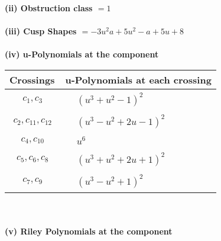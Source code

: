 \documentclass[1p]{elsarticle_modified}
\theoremstyle{definition}
\begin{document}
\flushleft \textbf{(ii) Obstruction class $= 1$}\\~\\
\flushleft \textbf{(iii) Cusp Shapes $= -3 u^2 a+5 u^2- a+5 u+8$}\\~\\
\newpage\renewcommand{\arraystretch}{1}
\flushleft \textbf{(iv) u-Polynomials at the component}\newline \\
\begin{tabular}{m{50pt}|m{274pt}}
Crossings & \hspace{64pt}u-Polynomials at each crossing \\
\hline $$\begin{aligned}c_{1},c_{3}\end{aligned}$$&$\begin{aligned}
&(u^3+u^2-1)^2
\end{aligned}$\\
\hline $$\begin{aligned}c_{2},c_{11},c_{12}\end{aligned}$$&$\begin{aligned}
&(u^3- u^2+2 u-1)^2
\end{aligned}$\\
\hline $$\begin{aligned}c_{4},c_{10}\end{aligned}$$&$\begin{aligned}
&u^6
\end{aligned}$\\
\hline $$\begin{aligned}c_{5},c_{6},c_{8}\end{aligned}$$&$\begin{aligned}
&(u^3+u^2+2 u+1)^2
\end{aligned}$\\
\hline $$\begin{aligned}c_{7},c_{9}\end{aligned}$$&$\begin{aligned}
&(u^3- u^2+1)^2
\end{aligned}$\\
\hline
\end{tabular}\\~\\
\newpage\renewcommand{\arraystretch}{1}
\flushleft \textbf{(v) Riley Polynomials at the component}\newline \\
\end{document}
